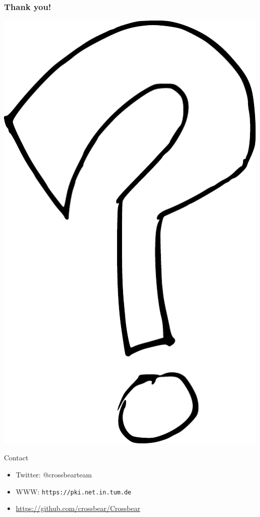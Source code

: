 \begin{frame}
\frametitle{Thank you!}
\vskip 1cm
  \begin{center}
    \includegraphics[scale=0.2]{figures/question_mark.pdf}
  \end{center}
\begin{block}{Contact}
      \begin{itemize}
	\item Twitter: @crossbearteam
        \item WWW: \texttt{https://pki.net.in.tum.de}
        \item \url{https://github.com/crossbear/Crossbear}
      \end{itemize}
  \end{block}
\end{frame}



